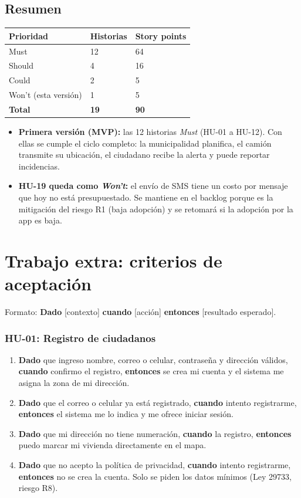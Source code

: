 \documentclass[11pt,a4paper]{article}
\newcommand{\dce}[3]{\textbf{Dado} #1, \textbf{cuando} #2, \textbf{entonces} #3}
\newcommand{\criterios}[1]{\subsubsection*{#1}}
\begin{document}
\subsection{Resumen}

\begin{center}
\begin{tabular}{L{4.5cm} C{2.5cm} C{2.8cm}}
\toprule
\textbf{Prioridad} & \textbf{Historias} & \textbf{Story points} \\
\midrule
Must & 12 & 64 \\
Should & 4 & 16 \\
Could & 2 & 5 \\
Won't (esta versión) & 1 & 5 \\
\midrule
\textbf{Total} & \textbf{19} & \textbf{90} \\
\bottomrule
\end{tabular}
\end{center}

\begin{itemize}
  \item \textbf{Primera versión (MVP):} las 12 historias \textit{Must} (HU-01 a HU-12). Con ellas se cumple el ciclo completo: la municipalidad planifica, el camión transmite su ubicación, el ciudadano recibe la alerta y puede reportar incidencias.
  \item \textbf{HU-19 queda como \textit{Won't}:} el envío de SMS tiene un costo por mensaje que hoy no está presupuestado. Se mantiene en el backlog porque es la mitigación del riesgo R1 (baja adopción) y se retomará si la adopción por la app es baja.
\end{itemize}

\clearpage
\section{Trabajo extra: criterios de aceptación}\label{sec:criterios}

Formato: \textbf{Dado} [contexto] \textbf{cuando} [acción] \textbf{entonces} [resultado esperado].

\criterios{HU-01: Registro de ciudadanos}
\begin{enumerate}
  \item \dce{que ingreso nombre, correo o celular, contraseña y dirección válidos}{confirmo el registro}{se crea mi cuenta y el sistema me asigna la zona de mi dirección.}
  \item \dce{que el correo o celular ya está registrado}{intento registrarme}{el sistema me lo indica y me ofrece iniciar sesión.}
  \item \dce{que mi dirección no tiene numeración}{la registro}{puedo marcar mi vivienda directamente en el mapa.}
  \item \dce{que no acepto la política de privacidad}{intento registrarme}{no se crea la cuenta. Solo se piden los datos mínimos (Ley 29733, riesgo R8).}
\end{enumerate}
\end{document}
